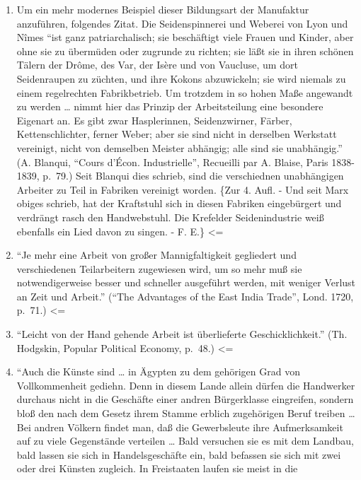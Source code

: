 {\begin{enumerate}
\def\labelenumi{(\arabic{enumi})}
\setcounter{enumi}{25}
\item
  Um ein mehr modernes Beispiel dieser Bildungsart der Manufaktur
  anzuführen, folgendes Zitat. Die Seidenspinnerei und Weberei von Lyon
  und Nîmes ``ist ganz patriarchalisch; sie beschäftigt viele Frauen und
  Kinder, aber ohne sie zu übermüden oder zugrunde zu richten; sie läßt
  sie in ihren schönen Tälern der Drôme, des Var, der Isère und von
  Vaucluse, um dort Seidenraupen zu züchten, und ihre Kokons
  abzuwickeln; sie wird niemals zu einem regelrechten Fabrikbetrieb. Um
  trotzdem in so hohen Maße angewandt zu werden \ldots{} nimmt hier das
  Prinzip der Arbeitsteilung eine besondere Eigenart an. Es gibt zwar
  Hasplerinnen, Seidenzwirner, Färber, Kettenschlichter, ferner Weber;
  aber sie sind nicht in derselben Werkstatt vereinigt, nicht von
  demselben Meister abhängig; alle sind sie unabhängig.'' (A. Blanqui,
  ``Cours d'Écon. Industrielle'', Recueilli par A. Blaise, Paris
  1838-1839, p.~79.) Seit Blanqui dies schrieb, sind die verschiednen
  unabhängigen Arbeiter zu Teil in Fabriken vereinigt worden. \{Zur 4.
  Aufl. - Und seit Marx obiges schrieb, hat der Kraftstuhl sich in
  diesen Fabriken eingebürgert und verdrängt rasch den Handwebstuhl. Die
  Krefelder Seidenindustrie weiß ebenfalls ein Lied davon zu singen. -
  F. E.\} \textless{}=
\item
  ``Je mehr eine Arbeit von großer Mannigfaltigkeit gegliedert und
  verschiedenen Teilarbeitern zugewiesen wird, um so mehr muß sie
  notwendigerweise besser und schneller ausgeführt werden, mit weniger
  Verlust an Zeit und Arbeit.'' (``The Advantages of the East India
  Trade'', Lond. 1720, p.~71.) \textless{}=
\item
  ``Leicht von der Hand gehende Arbeit ist überlieferte
  Geschicklichkeit.'' (Th. Hodgskin, Popular Political Economy, p.~48.)
  \textless{}=
\item
  ``Auch die Künste sind \ldots{} in Ägypten zu dem gehörigen Grad von
  Vollkommenheit gediehn. Denn in diesem Lande allein dürfen die
  Handwerker durchaus nicht in die Geschäfte einer andren Bürgerklasse
  eingreifen, sondern bloß den nach dem Gesetz ihrem Stamme erblich
  zugehörigen Beruf treiben \ldots{} Bei andren Völkern findet man, daß
  die Gewerbsleute ihre Aufmerksamkeit auf zu viele Gegenstände
  verteilen \ldots{} Bald versuchen sie es mit dem Landbau, bald lassen
  sie sich in Handelsgeschäfte ein, bald befassen sie sich mit zwei oder
  drei Künsten zugleich. In Freistaaten laufen sie meist in die

\end{enumerate}}
